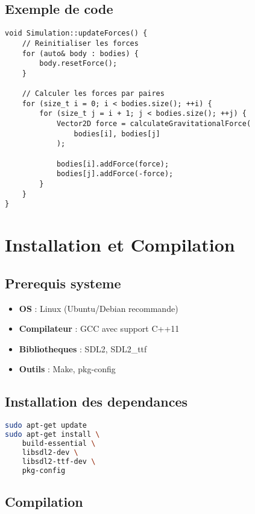 \documentclass[12pt,a4paper]{article}
\begin{document}
\subsection{Exemple de code}

\begin{lstlisting}[caption=Calcul des forces gravitationnelles]
void Simulation::updateForces() {
    // Reinitialiser les forces
    for (auto& body : bodies) {
        body.resetForce();
    }
    
    // Calculer les forces par paires
    for (size_t i = 0; i < bodies.size(); ++i) {
        for (size_t j = i + 1; j < bodies.size(); ++j) {
            Vector2D force = calculateGravitationalForce(
                bodies[i], bodies[j]
            );
            
            bodies[i].addForce(force);
            bodies[j].addForce(-force);
        }
    }
}
\end{lstlisting}

\section{Installation et Compilation}

\subsection{Prerequis systeme}

\begin{itemize}
    \item \textbf{OS} : Linux (Ubuntu/Debian recommande)
    \item \textbf{Compilateur} : GCC avec support C++11
    \item \textbf{Bibliotheques} : SDL2, SDL2\_ttf
    \item \textbf{Outils} : Make, pkg-config
\end{itemize}

\subsection{Installation des dependances}

\begin{lstlisting}[language=bash, caption=Installation Ubuntu/Debian]
sudo apt-get update
sudo apt-get install \
    build-essential \
    libsdl2-dev \
    libsdl2-ttf-dev \
    pkg-config
\end{lstlisting}

\subsection{Compilation}
\end{document}
